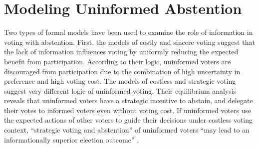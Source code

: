 \documentclass[letterpaper, 12pt]{article}
\begin{document}
    
    
    \section*{Modeling Uninformed Abstention}
    
    \par Two types of formal models have been used to examine the role of information in voting with abstention. First, the models of costly and sincere voting \citep{Downs1957anec, Riker1968thof, Matsusaka1995exvo} suggest that the lack of information influences voting by uniformly reducing the expected benefit from participation. According to their logic, uninformed voters are discouraged from participation due to the combination of high uncertainty in preference and high voting cost. The models of costless and strategic voting \citep{Feddersen1996thsw, Feddersen1999abin} suggest very different logic of uninformed voting. Their equilibrium analysis reveals that uninformed voters have a strategic incentive to abstain, and delegate their votes to informed voters even without voting cost. If uninformed voters use the expected actions of other voters to guide their decisions under costless voting context, ``strategic voting and abstention'' of uninformed voters ``may lead to an informationally superior election outcome'' \citep[][418]{Feddersen1996thsw}.  
    
\end{document}
